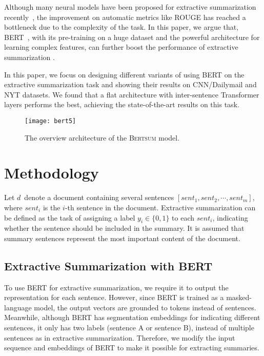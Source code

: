     Although many neural models have been proposed for extractive summarization recently~\citep{cheng2016neural,nallapati2017summarunner,narayan2018ranking, dong2018banditsum, zhang2018neural, zhou2018neural}, the improvement on automatic metrics like ROUGE has reached a bottleneck due to the complexity of the task.
       In this paper, we argue that,  BERT~\citep{devlin2018bert}, with its pre-training on a huge dataset and the powerful architecture for learning complex features, can further boost the performance of extractive summarization .
    
    In this paper, we focus on designing different variants of using BERT on the extractive summarization task and showing their results on CNN/Dailymail and NYT datasets.
    We found that a flat architecture with inter-sentence Transformer layers performs the best, achieving the state-of-the-art results on this task.
    
    
    \begin{figure*}[t]
        \centering
        \texttt{[image: bert5]}
        \label{trans}
        \caption{The overview  architecture of the \textsc{Bertsum} model.}
    \end{figure*}
    
    
    
    
    \section{Methodology}
    
    
    
    
    Let $d$~denote a document containing several sentences
    $[sent_1, sent_2, \cdots, sent_m]$, where $sent_i$ is the $i$-th
    sentence in the document.  Extractive summarization can be defined as
    the task of assigning a label $y_i \in \{0, 1\}$ to each $sent_i$,
    indicating whether the sentence should be included in the summary. It
    is assumed that summary sentences represent the most important content    of the document.
    
    \subsection{Extractive Summarization with BERT}
    
    To use BERT for extractive summarization, we require it to output the representation for each sentence. However, since BERT is trained as a masked-language model, the output vectors are grounded to tokens instead of sentences. Meanwhile, although BERT has segmentation embeddings for indicating different sentences, it only has two labels (sentence A or sentence B), instead of multiple sentences as in extractive summarization.
    Therefore, we modify the input sequence and embeddings of  BERT to make it possible for extracting summaries.
    
